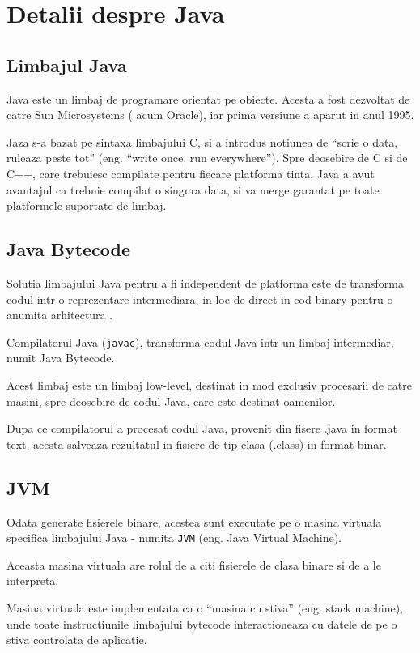 \chapter{Detalii despre Java}

\section{Limbajul Java}

Java este un limbaj de programare orientat pe obiecte. Acesta a fost
dezvoltat de catre Sun Microsystems ( acum Oracle), iar prima versiune a
aparut in anul 1995.

Jaza s-a bazat pe sintaxa limbajului C, si a introdus notiunea de
``scrie o data, ruleaza peste tot'' (eng. ``write once, run
everywhere''). Spre deosebire de C si de C++, care trebuiesc compilate
pentru fiecare platforma tinta, Java a avut avantajul ca trebuie
compilat o singura data, si va merge garantat pe toate platformele
suportate de limbaj.

\section{Java Bytecode}

Solutia limbajului Java pentru a fi independent de platforma este de
transforma codul intr-o reprezentare intermediara, in loc de direct in
cod binary pentru o anumita arhitectura .

Compilatorul Java (\texttt{javac}), transforma codul Java intr-un limbaj
intermediar, numit Java Bytecode.

Acest limbaj este un limbaj low-level, destinat in mod exclusiv
procesarii de catre masini, spre deosebire de codul Java, care este
destinat oamenilor.

Dupa ce compilatorul a procesat codul Java, provenit din fisere .java in
format text, acesta salveaza rezultatul in fisiere de tip clasa (.class)
in format binar.

\section{JVM}

Odata generate fisierele binare, acestea sunt executate pe o masina
virtuala specifica limbajului Java - numita \texttt{JVM}
(eng. Java Virtual Machine).

Aceasta masina virtuala are rolul de a citi fisierele de clasa binare si
de a le interpreta.

Masina virtuala este implementata ca o ``masina cu stiva'' (eng. stack
machine), unde toate instructiunile limbajului bytecode interactioneaza
cu datele de pe o stiva controlata de aplicatie.

